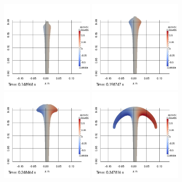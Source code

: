\begin{figure}
\begin{center}
\subcaptionbox{\label{top:jet:Gx:1}}
{
\includegraphics[width=0.4\textwidth]{topology/JetGrand/speedx0001.jpg}
}
\subcaptionbox{\label{top:jet:Gx:2}}
{
\includegraphics[width=0.4\textwidth]{topology/JetGrand/speedx0002.jpg}
}
\subcaptionbox{\label{top:jet:Gx:3}}
{
\includegraphics[width=0.4\textwidth]{topology/JetGrand/speedx0003.jpg}
}
\subcaptionbox{\label{top:jet:Gx:4}}
{
\includegraphics[width=0.4\textwidth]{topology/JetGrand/speedx0004.jpg}
}
\end{center}
\end{figure}
